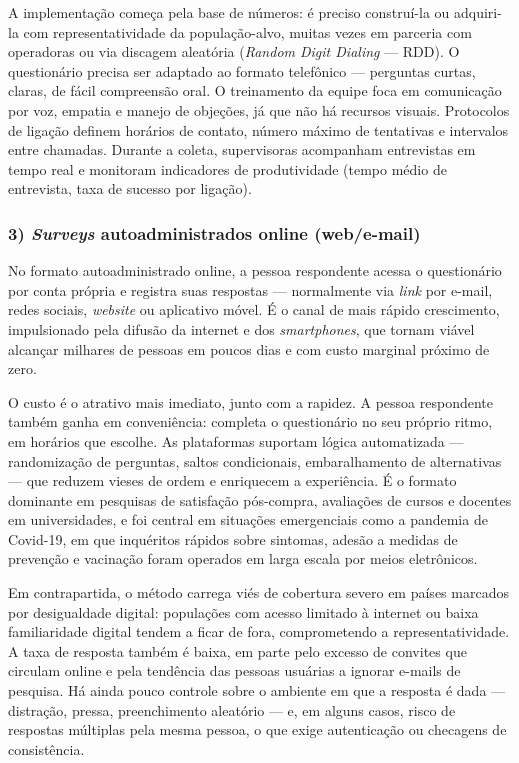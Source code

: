 \documentclass[12pt, a4paper, openany]{book}
\begin{document}
A implementa\c{c}\~ao come\c{c}a pela base de n\'umeros: \'e preciso constru\'i-la ou adquiri-la com representatividade da popula\c{c}\~ao-alvo, muitas vezes em parceria com operadoras ou via discagem aleat\'oria (\textit{Random Digit Dialing} --- RDD). O question\'ario precisa ser adaptado ao formato telef\^onico --- perguntas curtas, claras, de f\'acil compreens\~ao oral. O treinamento da equipe foca em comunica\c{c}\~ao por voz, empatia e manejo de obje\c{c}\~oes, j\'a que n\~ao h\'a recursos visuais. Protocolos de liga\c{c}\~ao definem hor\'arios de contato, n\'umero m\'aximo de tentativas e intervalos entre chamadas. Durante a coleta, supervisoras acompanham entrevistas em tempo real e monitoram indicadores de produtividade (tempo m\'edio de entrevista, taxa de sucesso por liga\c{c}\~ao).

\subsubsection*{3) \textit{Surveys} autoadministrados online (web/e-mail)}

No formato autoadministrado online, a pessoa respondente acessa o question\'ario por conta pr\'opria e registra suas respostas --- normalmente via \textit{link} por e-mail, redes sociais, \textit{website} ou aplicativo m\'ovel. \'E o canal de mais r\'apido crescimento, impulsionado pela difus\~ao da internet e dos \textit{smartphones}, que tornam vi\'avel alcan\c{c}ar milhares de pessoas em poucos dias e com custo marginal pr\'oximo de zero.

O custo \'e o atrativo mais imediato, junto com a rapidez. A pessoa respondente tamb\'em ganha em conveni\^encia: completa o question\'ario no seu pr\'oprio ritmo, em hor\'arios que escolhe. As plataformas suportam l\'ogica automatizada --- randomiza\c{c}\~ao de perguntas, saltos condicionais, embaralhamento de alternativas --- que reduzem vieses de ordem e enriquecem a experi\^encia. \'E o formato dominante em pesquisas de satisfa\c{c}\~ao p\'os-compra, avalia\c{c}\~oes de cursos e docentes em universidades, e foi central em situa\c{c}\~oes emergenciais como a pandemia de Covid-19, em que inqu\'eritos r\'apidos sobre sintomas, ades\~ao a medidas de preven\c{c}\~ao e vacina\c{c}\~ao foram operados em larga escala por meios eletr\^onicos.

Em contrapartida, o m\'etodo carrega vi\'es de cobertura severo em pa\'ises marcados por desigualdade digital: popula\c{c}\~oes com acesso limitado \`a internet ou baixa familiaridade digital tendem a ficar de fora, comprometendo a representatividade. A taxa de resposta tamb\'em \'e baixa, em parte pelo excesso de convites que circulam online e pela tend\^encia das pessoas usu\'arias a ignorar e-mails de pesquisa. H\'a ainda pouco controle sobre o ambiente em que a resposta \'e dada --- distra\c{c}\~ao, pressa, preenchimento aleat\'orio --- e, em alguns casos, risco de respostas m\'ultiplas pela mesma pessoa, o que exige autentica\c{c}\~ao ou checagens de consist\^encia.
\end{document}
